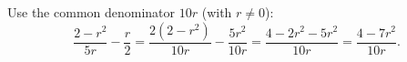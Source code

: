 Use the common denominator $10r$ (with $r\ne0$):
\[
\dfrac{2-r^2}{5r}-\dfrac {r}{2}=\dfrac{2(2-r^2)}{10r}-\dfrac{5r^2}{10r}=\dfrac{4-2r^2-5r^2}{10r}=\boxed{\dfrac{4-7r^2}{10r}}.
\]
